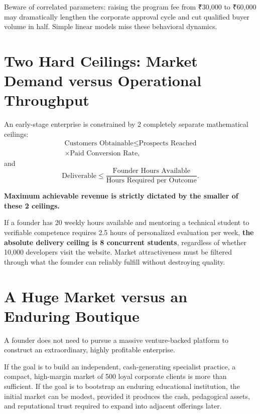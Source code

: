 Beware of correlated parameters: raising the program fee from ₹30,000 to ₹60,000 may dramatically lengthen the corporate approval cycle and cut qualified buyer volume in half. Simple linear models miss these behavioral dynamics.

\section{Two Hard Ceilings: Market Demand versus Operational Throughput}

An early-stage enterprise is constrained by 2 completely separate mathematical ceilings:
\begin{multline}
\label{eq:ceiling_demand}
\text{Customers Obtainable} \le \text{Prospects Reached} \\
\times \text{Paid Conversion Rate},
\end{multline}
and
\begin{equation}
\label{eq:ceiling_delivery}
\text{Deliverable} \le \frac{\text{Founder Hours Available}}{\text{Hours Required per Outcome}}.
\end{equation}

\textbf{Maximum achievable revenue is strictly dictated by the smaller of these 2 ceilings.}

If a founder has 20 weekly hours available and mentoring a technical student to verifiable competence requires 2.5 hours of personalized evaluation per week, \textbf{the absolute delivery ceiling is 8 concurrent students}, regardless of whether 10,000 developers visit the website. Market attractiveness must be filtered through what the founder can reliably fulfill without destroying quality.

\section{A Huge Market versus an Enduring Boutique}

A founder does not need to pursue a massive venture-backed platform to construct an extraordinary, highly profitable enterprise.

If the goal is to build an independent, cash-generating specialist practice, a compact, high-margin market of 500 loyal corporate clients is more than sufficient. If the goal is to bootstrap an enduring educational institution, the initial market can be modest, provided it produces the cash, pedagogical assets, and reputational trust required to expand into adjacent offerings later.

